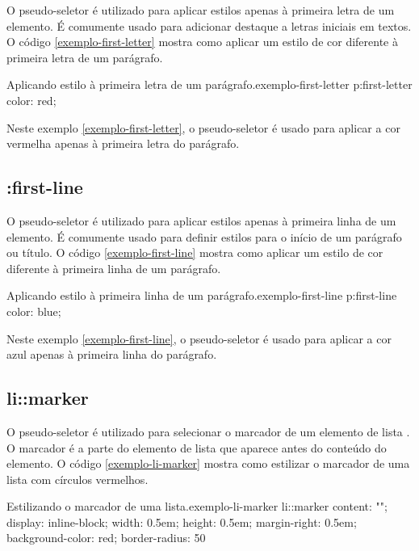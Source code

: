 O pseudo-seletor  é utilizado para aplicar estilos apenas à primeira letra de um elemento. É comumente usado para adicionar destaque a letras iniciais em textos. O código \ref{exemplo-first-letter} mostra como aplicar um estilo de cor diferente à primeira letra de um parágrafo.

\begin{csscode}{Aplicando estilo à primeira letra de um parágrafo.}{exemplo-first-letter}
    p:first-letter {
    color: red;
}
\end{csscode}

Neste exemplo \ref{exemplo-first-letter}, o pseudo-seletor  é usado para aplicar a cor vermelha apenas à primeira letra do parágrafo.

\subsection{:first-line}

O pseudo-seletor  é utilizado para aplicar estilos apenas à primeira linha de um elemento. É comumente usado para definir estilos para o início de um parágrafo ou título. O código \ref{exemplo-first-line} mostra como aplicar um estilo de cor diferente à primeira linha de um parágrafo.

\begin{csscode}{Aplicando estilo à primeira linha de um parágrafo.}{exemplo-first-line}
p:first-line {
    color: blue;
}
\end{csscode}

Neste exemplo \ref{exemplo-first-line}, o pseudo-seletor  é usado para aplicar a cor azul apenas à primeira linha do parágrafo.

\subsection{li::marker}

O pseudo-seletor  é utilizado para selecionar o marcador de um elemento de lista . O marcador é a parte do elemento de lista que aparece antes do conteúdo do elemento. O código \ref{exemplo-li-marker} mostra como estilizar o marcador de uma lista com círculos vermelhos.

\begin{csscode}{Estilizando o marcador de uma lista.}{exemplo-li-marker}
li::marker {
    content: "";
    display: inline-block;
    width: 0.5em;
    height: 0.5em;
    margin-right: 0.5em;
    background-color: red;
    border-radius: 50%
}
\end{csscode}

